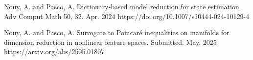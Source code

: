 

\begin{cvpublications}


\cvpublication
{Nouy, A. and Pasco, A.} %
{Dictionary-based model reduction for state estimation.} %
{Adv Comput Math 50, 32.} %
{Apr. 2024} %
{https://doi.org/10.1007/s10444-024-10129-4} %


\end{cvpublications}


\begin{cvpublications}


\cvpublication
{Nouy, A. and Pasco, A.} %
{Surrogate to Poincar\'e inequalities on manifolds for dimension reduction in nonlinear feature spaces.} %
{Submitted.} %
{May. 2025} %
{https://arxiv.org/abs/2505.01807} %


\end{cvpublications}
